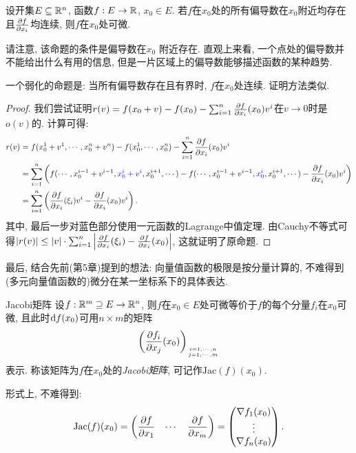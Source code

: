 \begin{proposition}{}
	设开集$E \subseteq \mathbb{R} ^n$, 函数$f: E \to \mathbb{R}$, $x_0 \in E$. 若$f$在$x_0$处的所有偏导数在$x_0$附近均存在且$\frac{\partial f}{\partial x_i}$均连续, 则$f$在$x_0$处可微. 
\end{proposition}
\begin{remark}
	请注意, 该命题的条件是偏导数在$x_0${\color{blue} 附近}存在. 直观上来看, 一个点处的偏导数并不能给出什么有用的信息, 但是一片区域上的偏导数能够描述函数的某种趋势. 
\end{remark}
\begin{remark}
	一个弱化的命题是: 当所有偏导数存在且有界时, $f$在$x_0$处连续. 证明方法类似. 
\end{remark}
\begin{proof}
	我们尝试证明$r(v)=f(x_0+v)-f(x_0)-\sum_{i=1}^{n} \frac{\partial f}{\partial x_i}(x_0)v^i$在$v \to 0$时是$o(v)$的. 计算可得: 
	\begin{align*}
		r(v) &= f(x_0^1+v^1,\cdots ,x_0^n+v^n) - f(x_0^1,\cdots ,x_0^n) - \sum_{i=1}^{n} \frac{\partial f}{\partial x_i}(x_0)v^i \\
		&= \sum_{i=1}^{n} \left( f(\cdots ,x_0^{i-1}+v^{i-1},{\color{blue} x_0^{i}+v^{i} },x_0^{i+1},\cdots) - f(\cdots ,x_0^{i-1}+v^{i-1},{\color{blue}x_0^{i} },x_0^{i+1},\cdots) - \frac{\partial f}{\partial x_i}(x_0)v^i \right) \\
		&= \sum_{i=1}^{n} \left( \frac{\partial f}{\partial x_i}(\xi _i)v^i - \frac{\partial f}{\partial x_i}(x_0)v^i \right). 
	\end{align*}
	其中, 最后一步对蓝色部分使用一元函数的Lagrange中值定理. 由Cauchy不等式可得$|r(v)| \leq |v| \cdot \sum_{i=1}^{n}\left| \frac{\partial f}{\partial x_i}(\xi _i) - \frac{\partial f}{\partial x_i}(x_0) \right|$, 这就证明了原命题. 
\end{proof}

最后, 结合先前(第5章)提到的想法: 向量值函数的极限是按分量计算的, 不难得到(多元向量值函数的)微分在某一坐标系下的具体表达. 

\begin{proposition}{Jacobi矩阵}
	设$f:\mathbb{R} ^m \supseteq E \to \mathbb{R} ^n$, 则$f$在$x_0 \in E$处可微等价于$f$的每个分量$f_i$在$x_0$可微, 且此时$\mathop{}\!\mathrm{d} f (x_0)$可用$n \times m$的矩阵$$\left( \frac{\partial f_i}{\partial x_j}(x_0) \right)_{i=1,\cdots ,n \atop j=1,\cdots ,m}$$
	表示. 称该矩阵为$f$在$x_0$处的\textit{Jacobi矩阵}, 可记作$\mathrm{Jac} (f)(x_0)$. 
\end{proposition}

形式上, 不难得到: $$\mathrm{Jac}(f)(x_0) = \begin{pmatrix}
	\dfrac{\partial f}{\partial x_1} & \cdots & \dfrac{\partial f}{\partial x_m}
\end{pmatrix} = \begin{pmatrix}
	\nabla f_1(x_0) \\ \vdots \\ \nabla f_n(x_0)
\end{pmatrix}.$$


